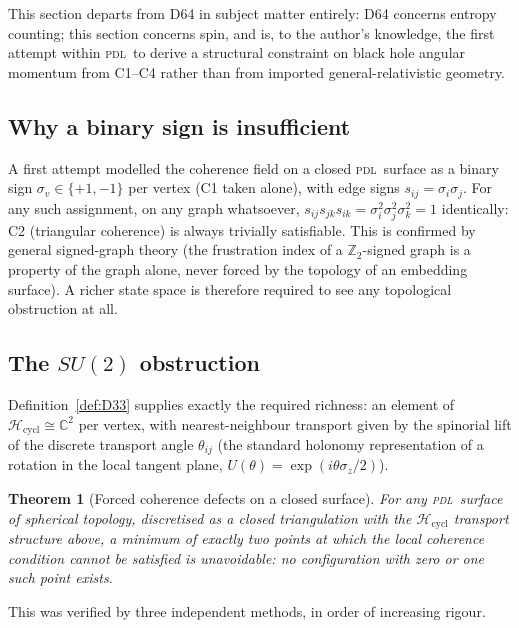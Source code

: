 \documentclass[12pt,a4paper]{article}
\newtheorem{theorem}{Theorem}[section]
\newcommand{\PDL}{\textsc{pdl}}
\newcommand{\sig}{\sigma}
\newcommand{\Hcycl}{\mathcal{H}_{\mathrm{cycl}}}
\begin{document}
This section departs from D64 in subject matter entirely: D64
concerns entropy counting; this section concerns spin, and is, to
the author's knowledge, the first attempt within \PDL\ to derive a
structural constraint on black hole angular momentum from C1--C4
rather than from imported general-relativistic geometry.

\subsection{Why a binary sign is insufficient}

\begin{negativebox}
A first attempt modelled the coherence field on a closed \PDL\
surface as a binary sign $\sig_v\in\{+1,-1\}$ per vertex (C1 taken
alone), with edge signs $s_{ij}=\sig_i\sig_j$. For any such
assignment, on any graph whatsoever,
$s_{ij}s_{jk}s_{ik}=\sig_i^2\sig_j^2\sig_k^2=1$ identically: C2
(triangular coherence) is always trivially satisfiable. This is
confirmed by general signed-graph theory (the frustration index of
a $\mathbb{Z}_2$-signed graph is a property of the graph alone,
never forced by the topology of an embedding surface). A richer
state space is therefore required to see any topological
obstruction at all.
\end{negativebox}

\subsection{\texorpdfstring{The $SU(2)$ obstruction}{The SU(2) obstruction}}

Definition~\ref{def:D33} supplies exactly the required richness: an
element of $\Hcycl\cong\mathbb{C}^2$ per vertex, with nearest-neighbour
transport given by the spinorial lift of the discrete
transport angle $\theta_{ij}$ (the standard holonomy representation
of a rotation in the local tangent plane, $U(\theta)=\exp(i\theta
\sigma_z/2)$).

\begin{theorem}[Forced coherence defects on a closed surface]
\label{thm:2defects}
For any \PDL\ surface of spherical topology, discretised as a
closed triangulation with the $\Hcycl$ transport structure above, a
minimum of exactly two points at which the local coherence
condition cannot be satisfied is unavoidable: no configuration with
zero or one such point exists.
\end{theorem}

This was verified by three independent methods, in order of
increasing rigour.
\end{document}
